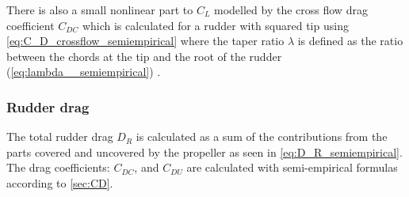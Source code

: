 There is also a small nonlinear part to $C_L$ modelled by the cross flow drag coefficient $C_{DC}$ which is calculated for a rudder with squared tip using \autoref{eq:C_D_crossflow_semiempirical} where the taper ratio $\lambda$ is defined as the ratio between the chords at the tip and the root of the rudder (\autoref{eq:lambda__semiempirical}) \citep{hughes_tempest_2011}. 
\begin{equation}
    \label{eq:C_D_crossflow_semiempirical}
    
\end{equation}
%
\begin{equation}
    \label{eq:lambda__semiempirical}
    
\end{equation}
%
%
\subsubsection{Rudder drag}
\label{sec:rudder_drag}
The total rudder drag $D_R$ is calculated as a sum of the contributions from the parts covered and uncovered by the propeller as seen in \autoref{eq:D_R_semiempirical}.
\begin{equation}
    \label{eq:D_R_semiempirical}
    
\end{equation}
The drag coefficients: $C_{DC}$, and $C_{DU}$ are calculated with semi-empirical formulas according to \autoref{sec:CD}.

